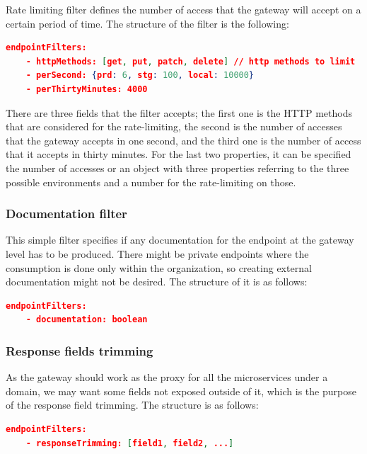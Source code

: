 \documentclass[english, 12pt, a4paper, sci, utf8, a-1b, online]{aaltothesis}
\begin{document}
Rate limiting filter defines the number of access that the gateway will accept on a certain period of time. The structure of the filter is the following: \\

\begin{lstlisting}[language=json,firstnumber=1]
  endpointFilters:
    - httpMethods: [get, put, patch, delete] // http methods to limit
    - perSecond: {prd: 6, stg: 100, local: 10000}
    - perThirtyMinutes: 4000
\end{lstlisting}

There are three fields that the filter accepts; the first one is the HTTP methods that are considered for the rate-limiting, the second is the number of accesses that the gateway accepts in one second, and the third one is the number of access that it accepts in thirty minutes. For the last two properties, it can be specified the number of accesses or an object with three properties referring to the three possible environments and a number for the rate-limiting on those.

\subsubsection*{Documentation filter}

This simple filter specifies if any documentation for the endpoint at the gateway level has to be produced. There might be private endpoints where the consumption is done only within the organization, so creating external documentation might not be desired. The structure of it is as follows:\\

\begin{lstlisting}[language=json,firstnumber=1]
  endpointFilters:
    - documentation: boolean
\end{lstlisting}

\subsubsection*{Response fields trimming}

As the gateway should work as the proxy for all the microservices under a domain, we may want some fields not exposed outside of it, which is the purpose of the response field trimming. The structure is as follows:\\

\begin{lstlisting}[language=json,firstnumber=1]
  endpointFilters:
    - responseTrimming: [field1, field2, ...]
\end{lstlisting}
\end{document}

